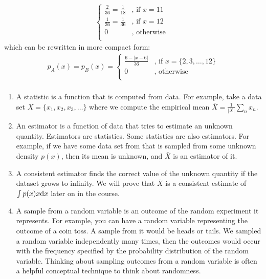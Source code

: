 \begin{enumerate}[label=\alph*.]
\begin{align*}
\begin{cases}
\frac{2}{36} = \frac{1}{18} &\text{, if } x = 11\\
\frac{1}{36} = \frac{1}{36} &\text{, if } x = 12\\
0 &\text{, otherwise } \\
\end{cases}
\end{align*}
which can be rewritten in more compact form:
\begin{align*}
p_A(x) = p_B(x) = \begin{cases}
\frac{6 - |x-6|}{36} &\text{, if } x = \{ 2, 3, \ldots, 12\}\\
0 &\text{, otherwise } \\
\end{cases}
\end{align*}
\end{enumerate}


\paragraph{}
\begin{enumerate}[label=\alph*.]
\item A statistic is a function that is computed from data. For example, take a data set $X = \{x_1, x_2, x_3, \dots\}$ where we compute the empirical mean $\bar X = \frac{1}{|X|}\sum_n x_n$.
\item An estimator is a function of data that tries to estimate an unknown quantity. Estimators are statistics. Some statistics are also estimators. For example, if we have some data set from that is sampled from some unknown density $p(x)$, then its mean is unknown, and $\bar X$ is an estimator of it.
\item A consistent estimator finds the correct value of the unknown quantity if the dataset grows to infinity. We will prove that $\bar X$ is a consistent estimate of $\int p(x) x \mathrm{d} x$ later on in the course.
\item A sample from a random variable is an outcome of the random experiment it represents. For example, you can have a random variable representing the outcome of a coin toss. A sample from it would be heads or tails. We sampled a random variable independently many times, then the outcomes would occur with the frequency specified by the probability distribution of the random variable. Thinking about sampling outcomes from a random variable is often a helpful conceptual technique to think about randomness.
\end{enumerate}


